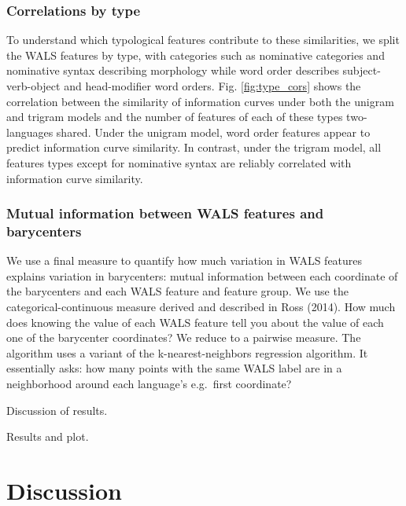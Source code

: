 \documentclass[man,floatsintext]{apa6}
\begin{document}
\hypertarget{correlations-by-type}{%
\subsubsection{Correlations by type}\label{correlations-by-type}}

To understand which typological features contribute to these similarities, we split the WALS features by type, with categories such as nominative categories and nominative syntax describing morphology while word order describes subject-verb-object and head-modifier word orders. Fig. \ref{fig:type_cors} shows the correlation between the similarity of information curves under both the unigram and trigram models and the number of features of each of these types two-languages shared. Under the unigram model, word order features appear to predict information curve similarity. In contrast, under the trigram model, all features types except for nominative syntax are reliably correlated with information curve similarity.

\hypertarget{mutual-information-between-wals-features-and-barycenters}{%
\subsubsection{Mutual information between WALS features and barycenters}\label{mutual-information-between-wals-features-and-barycenters}}

We use a final measure to quantify how much variation in WALS features explains variation in barycenters: mutual information between each coordinate of the barycenters and each WALS feature and feature group. We use the categorical-continuous measure derived and described in Ross (2014). How much does knowing the value of each WALS feature tell you about the value of each one of the barycenter coordinates? We reduce to a pairwise measure. The algorithm uses a variant of the k-nearest-neighbors regression algorithm. It essentially asks: how many points with the same WALS label are in a neighborhood around each language's e.g.~first coordinate?

Discussion of results.

Results and plot.

\hypertarget{discussion}{%
\section{Discussion}\label{discussion}}
\end{document}

